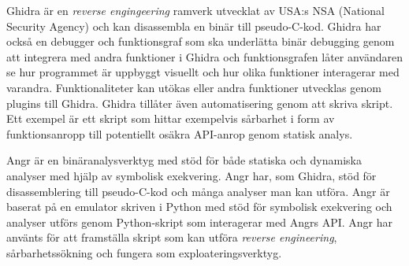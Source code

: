 Ghidra är en \emph{reverse engingeering} ramverk utvecklat av USA:s NSA
(National Security Agency) och kan disassembla en binär till pseudo-C-kod.
Ghidra har också en debugger och funktionsgraf som ska underlätta binär
debugging genom att integrera med andra funktioner i Ghidra och funktionsgrafen
låter användaren se hur programmet är uppbyggt visuellt och hur olika
funktioner interagerar med varandra. Funktionaliteter kan utökas eller andra
funktioner utvecklas genom plugins till Ghidra\cite{ghidra_use_cases}. Ghidra
tillåter även automatisering genom att skriva skript. Ett exempel är ett skript
som hittar exempelvis sårbarhet i form av funktionsanropp till potentiellt
osäkra API-anrop genom statisk analys\cite{ghidra_script}.

Angr är en binäranalysverktyg med stöd för både statiska och dynamiska analyser
med hjälp av symbolisk exekvering. Angr har, som Ghidra, stöd för
disassemblering till pseudo-C-kod och många analyser man kan utföra. Angr är
baserat på en emulator skriven i Python med stöd för symbolisk exekvering och
analyser utförs genom Python-skript som interagerar med Angrs API. Angr har
använts för att framställa skript som kan utföra \emph{reverse engineering},
sårbarhetssökning och fungera som exploateringsverktyg\cite{angr_docs}.
